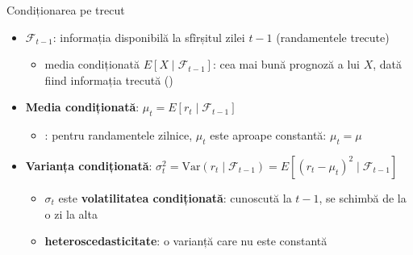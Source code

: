 \begin{frame}{Condiționarea pe trecut}
\itemsize{\small}
\begin{itemize}
    \item $\mathcal{F}_{t-1}$: informația disponibilă la sfîrșitul zilei $t-1$ (randamentele trecute)
    \begin{itemize}
        \item media condiționată $E[X \mid \mathcal{F}_{t-1}]$: cea mai bună prognoză a lui $X$, dată fiind informația trecută ()
    \end{itemize}
    \item \textbf{Media condiționată}: $\mu_t = E[r_t \mid \mathcal{F}_{t-1}]$
    \begin{itemize}
        \item {}: pentru randamentele zilnice, $\mu_t$ este aproape constantă: $\mu_t = \mu$
    \end{itemize}
    \item \textbf{Varianța condiționată}: $\sigma_t^2 = \mathrm{Var}(r_t \mid \mathcal{F}_{t-1}) = E[(r_t - \mu_t)^2 \mid \mathcal{F}_{t-1}]$
    \begin{itemize}
        \item $\sigma_t$ este \textbf{volatilitatea condiționată}: cunoscută la $t-1$, se schimbă de la o zi la alta
        \item \textbf{heteroscedasticitate}: o varianță care nu este constantă
    \end{itemize}
\end{itemize}
\end{frame}

